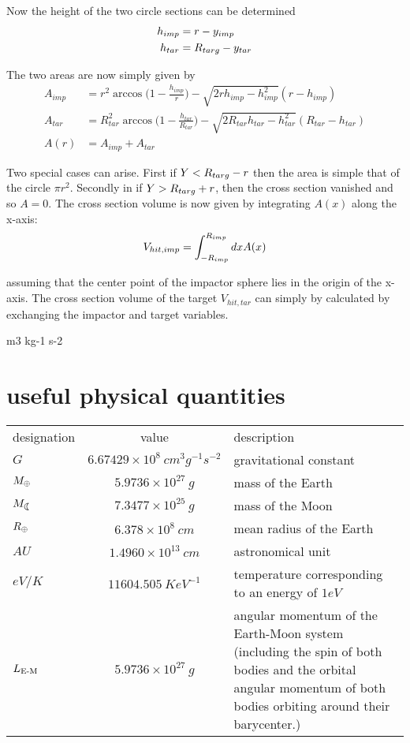 Now the height of the two circle sections can be determined
\begin{align}
\label{ch07_sec01_eq003}
h_{imp} &= r - y_{imp}\\
h_{tar} &= R_{targ} - y_{tar} 
\end{align}

The two areas are now simply given by
\begin{align}
\label{ch07_sec01_eq004}
A_{imp} &= r^2 \arccos{\Big( 1 - \frac{h_{imp}}{r} \Big) } - \sqrt{2 r h_{imp} - h_{imp}^2} (r - h_{imp} )  \\
A_{tar} &= R_{tar}^2 \arccos{\Big(1 - \frac{h_{tar}}{R_{tar}} \Big)  } - \sqrt{2 R_{tar} h_{tar} - h_{tar}^2} (R_{tar} - h_{tar} )  \\
A(r) &= A_{imp} + A_{tar}
\end{align}

Two special cases can arise. First if $Y < R_{targ} - r $ then the area is simple that of the circle $\pi r^2$. Secondly in if $Y > R_{targ} + r$, then the cross section vanished and so $A = 0$. The cross section volume is now given by integrating $A(x)$ along the x-axis:
\begin{align}
\label{ch07_sec01_eq002}
V_{hit, imp} = \int_{-R_{imp}}^{R_{imp}} dx A(x)
\end{align}

assuming that the center point of the impactor sphere lies in the origin of the x-axis. The cross section volume of the target $V_{hit, tar}$ can simply by calculated by exchanging the impactor and target variables. 

m3 kg-1 s-2
\clearpage

\section{useful physical quantities}

\begin{tabular}{l c p{10.0cm}}
designation & value & description \\
$ G $ &  $6.67429 \times 10^{8} ~cm^3 g^{-1} s^{-2} $ & gravitational constant \\ 
$ M_{\oplus} $ & $ 5.9736 \times 10^{27} ~g$ & mass of the Earth \\
$ \ML $ & $ 7.3477 \times 10^{25} ~g$ & mass of the Moon \\
$ R_{\oplus} $ & $ 6.378 \times 10^8 ~cm$ & mean radius of the Earth \\
$ AU $ & $ 1.4960 \times 10^{13} ~cm$ & astronomical unit \\
$ eV / K$ & $ 11604.505 ~ K eV^{-1}$ & temperature corresponding to an energy of $1 eV$ \\
$ L_{\textrm{E-M}} $ & $ 5.9736 \times 10^{27}~ g$ & angular momentum of the Earth-Moon system (including the spin of both bodies and the orbital angular momentum of both bodies orbiting around their barycenter.)\\
\end{tabular}





